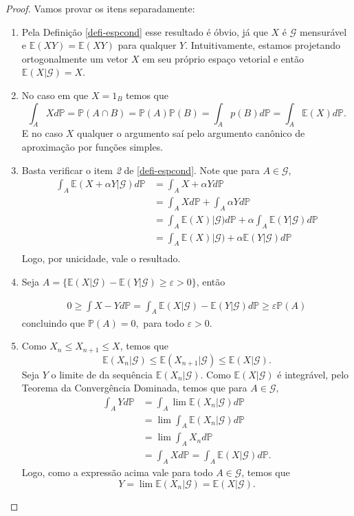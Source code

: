 \documentclass[12pt,a4paper,oneside]{book}
\theoremstyle{definition}
\theoremstyle{remark}
\numberwithin{equation}{section}
\newcommand{\e}{\varepsilon}
\newcommand{\E}{\mathbb{E}}
\newcommand{\pr}{\mathbb{P}}
\begin{document}
\begin{proof}
Vamos provar os itens separadamente:
\begin{enumerate}

\item Pela Definição \ref{defi-espcond} esse resultado é óbvio, já que $X$ é $\mathcal{G}$ mensurável e $\E(XY)=\E(XY)$ para qualquer $Y$.
Intuitivamente, estamos projetando ortogonalmente um vetor $X$ em seu próprio espaço vetorial e então $\E(X|\mathcal{G}) = X.$ 

\item No caso em que $X=1_B$ temos que
$$ \int_A Xd\pr  = \pr(A\cap B) = \pr(A)\pr(B) = \int_A p(B)d\pr = \int_A \E(X)d\pr.$$
E no caso $X$ qualquer o argumento saí pelo argumento canônico de aproximação por funções simples.


\item Basta verificar o item \emph{2} de \ref{defi-espcond}. Note que para $A\in \mathcal{G}$,
\begin{align}
\int_A\E(X+\alpha Y|\mathcal{G})d\pr &= \int_A X+\alpha Y d\pr \\
                                     &= \int_A Xd\pr+\int_A\alpha Y d\pr\\
                                     &=\int_A\E(X)|\mathcal{G})d\pr + \alpha\int_A\E(Y|\mathcal{G})d\pr\\
                                     &= \int_A\E(X)|\mathcal{G})+\alpha\E(Y|\mathcal{G})d\pr\\
\end{align}
Logo, por unicidade,  vale o resultado.

\item Seja $A=\{\E(X|\mathcal{G})- \E(Y|\mathcal{G})\geq \e>0\}$, então

\begin{align*}
0\geq\int X-Yd\pr = \int_A\E(X|\mathcal{G})- \E(Y|\mathcal{G})d\pr \geq \e\pr(A)
\end{align*}
concluindo que $\pr(A)=0,$ para todo $\e>0$. 


\item Como $X_{n}\leq X_{n+1}\leq X$, temos que 
$$\E(X_n|\mathcal{G})\leq\E(X_{n+1}|\mathcal{G})\leq \E(X|\mathcal{G}) .$$
Seja $Y$ o limite de da sequência $\E(X_n|\mathcal{G})$. Como $\E(X|\mathcal{G})$ é integrável, pelo Teorema da Convergência Dominada, temos que para $A\in\mathcal{G},$
\begin{align*}
\int_A Y d\pr &= \int_A\lim\E(X_n|\mathcal{G})d\pr\\
 &= \lim\int_A\E(X_n|\mathcal{G})d\pr\\
 &= \lim\int_A X_nd\pr\\ 
 &=  \int_A X d\pr = \int_A\E(X|\mathcal{G})d\pr.
\end{align*}
Logo, como a expressão acima vale para todo $A\in\mathcal{G}$, temos que 
$$Y=\lim \E(X_n|\mathcal{G}) = \E(X|\mathcal{G}).$$


\end{enumerate}
\end{proof}
\end{document}

